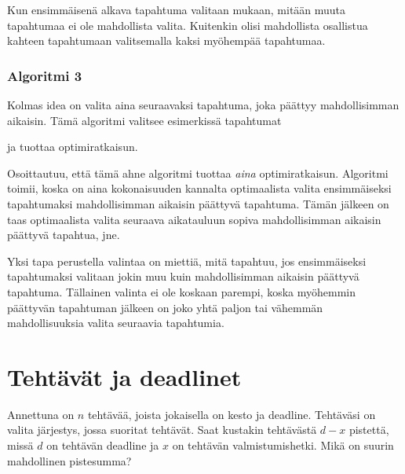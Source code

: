 Kun ensimmäisenä alkava tapahtuma
valitaan mukaan, mitään muuta tapahtumaa
ei ole mahdollista valita.
Kuitenkin olisi mahdollista osallistua
kahteen tapahtumaan valitsemalla
kaksi myöhempää tapahtumaa.

\subsubsection*{Algoritmi 3}

Kolmas idea on valita aina seuraavaksi tapahtuma,
joka päättyy mahdollisimman aikaisin.
Tämä algoritmi valitsee esimerkissä tapahtumat
\\
\begin{center}
\end{center}
ja tuottaa optimiratkaisun.

Osoittautuu, että tämä ahne algoritmi
tuottaa \textit{aina} optimiratkaisun.
Algoritmi toimii, koska on aina kokonaisuuden
kannalta optimaalista valita
ensimmäiseksi tapahtumaksi
mahdollisimman aikaisin päättyvä tapahtuma.
Tämän jälkeen on taas optimaalista
valita seuraava aikatauluun sopiva
mahdollisimman aikaisin
päättyvä tapahtua, jne.

Yksi tapa perustella valintaa on miettiä,
mitä tapahtuu, jos ensimmäiseksi tapahtumaksi
valitaan jokin muu kuin mahdollisimman
aikaisin päättyvä tapahtuma.
Tällainen valinta ei ole koskaan parempi,
koska myöhemmin päättyvän tapahtuman
jälkeen on joko yhtä paljon tai vähemmän
mahdollisuuksia valita seuraavia tapahtumia.

\section{Tehtävät ja deadlinet}

\begin{task}
Annettuna on $n$ tehtävää,
joista jokaisella on kesto ja deadline.
Tehtäväsi on valita järjestys,
jossa suoritat tehtävät.
Saat kustakin tehtävästä $d-x$ pistettä,
missä $d$ on tehtävän deadline ja $x$
on tehtävän valmistumishetki.
Mikä on suurin mahdollinen pistesumma?
\end{task}

